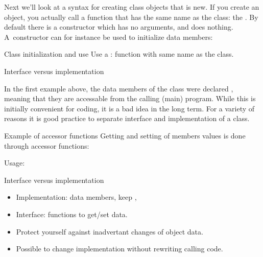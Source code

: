 Next we'll look at a syntax for creating class objects that is new. If
you create an object, you actually call a function that has the same
name as the class: the . By default there is a
constructor which has no arguments, and does nothing. A~constructor
can for instance be used to initialize data members:
%

\begin{slide}{Class initialization and use}
  \label{sl:class-construct}
  Use a : function with same name as the class.
\end{slide}

 {Interface versus implementation}

In the first example above, the data members of the  class were
declared , meaning that they are accessable from the calling
(main) program. While this is initially convenient for coding, it is a bad idea
in the long term. For a variety of reasons it is good practice to
separate interface and implementation of a class.

\begin{block}{Example of accessor functions}
  \label{sl:pointaccess}
  Getting and setting of members values is done through accessor functions:
  \begin{multicols}{2}
  \end{multicols}
  Usage:
\end{block}

\begin{block}{Interface versus implementation}
  \label{sl:interfaceimpl}
  \begin{itemize}
  \item Implementation: data members, keep ,
  \item Interface:  functions to get/set data.
  \item Protect yourself against inadvertant changes of object data.
  \item Possible to change implementation without rewriting calling code.
  \end{itemize}
\end{block}

